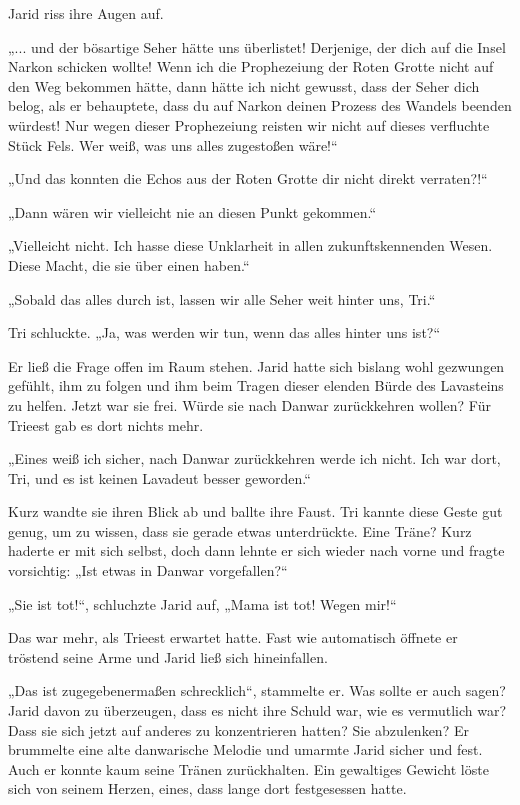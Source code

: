 Jarid riss ihre Augen auf.

„... und der bösartige Seher hätte uns überlistet! Derjenige, der dich auf die Insel Narkon schicken wollte! Wenn ich die Prophezeiung der Roten Grotte nicht auf den Weg bekommen hätte, dann hätte ich nicht gewusst, dass der Seher dich belog, als er behauptete, dass du auf Narkon deinen Prozess des Wandels beenden würdest! Nur wegen dieser Prophezeiung reisten wir nicht auf dieses verfluchte Stück Fels. Wer weiß, was uns alles zugestoßen wäre!“

„Und das konnten die Echos aus der Roten Grotte dir nicht direkt verraten?!“

„Dann wären wir vielleicht nie an diesen Punkt gekommen.“

„Vielleicht nicht. Ich hasse diese Unklarheit in allen zukunftskennenden Wesen. Diese Macht, die sie über einen haben.“

„Sobald das alles durch ist, lassen wir alle Seher weit hinter uns, Tri.“

Tri schluckte. „Ja, was werden wir tun, wenn das alles hinter uns ist?“

Er ließ die Frage offen im Raum stehen. Jarid hatte sich bislang wohl gezwungen gefühlt, ihm zu folgen und ihm beim Tragen dieser elenden Bürde des Lavasteins zu helfen. Jetzt war sie frei. Würde sie nach Danwar zurückkehren wollen? Für Trieest gab es dort nichts mehr.

„Eines weiß ich sicher, nach Danwar zurückkehren werde ich nicht. Ich war dort, Tri, und es ist keinen Lavadeut besser geworden.“

Kurz wandte sie ihren Blick ab und ballte ihre Faust. Tri kannte diese Geste gut genug, um zu wissen, dass sie gerade etwas unterdrückte. Eine Träne? Kurz haderte er mit sich selbst, doch dann lehnte er sich wieder nach vorne und fragte vorsichtig: „Ist etwas in Danwar vorgefallen?“

„Sie ist tot!“, schluchzte Jarid auf, „Mama ist tot! Wegen mir!“

Das war mehr, als Trieest erwartet hatte. Fast wie automatisch öffnete er tröstend seine Arme und Jarid ließ sich hineinfallen.

„Das ist zugegebenermaßen schrecklich“, stammelte er. Was sollte er auch sagen? Jarid davon zu überzeugen, dass es nicht ihre Schuld war, wie es vermutlich war? Dass sie sich jetzt auf anderes zu konzentrieren hatten? Sie abzulenken? Er brummelte eine alte danwarische Melodie und umarmte Jarid sicher und fest. Auch er konnte kaum seine Tränen zurückhalten. Ein gewaltiges Gewicht löste sich von seinem Herzen, eines, dass lange dort festgesessen hatte.

